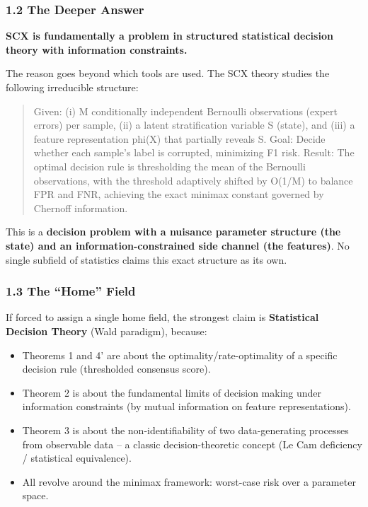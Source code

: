 \documentclass[
  12pt,
]{ctexart}
\providecommand{\tightlist}{%
  \setlength{\itemsep}{0pt}\setlength{\parskip}{0pt}}
\begin{document}
\subsubsection{1.2 The Deeper Answer}\label{the-deeper-answer}

\textbf{SCX is fundamentally a problem in structured statistical
decision theory with information constraints.}

The reason goes beyond which tools are used. The SCX theory studies the
following irreducible structure:

\begin{quote}
Given: (i) M conditionally independent Bernoulli observations (expert
errors) per sample, (ii) a latent stratification variable S (state), and
(iii) a feature representation phi(X) that partially reveals S. Goal:
Decide whether each sample's label is corrupted, minimizing F1 risk.
Result: The optimal decision rule is thresholding the mean of the
Bernoulli observations, with the threshold adaptively shifted by O(1/M)
to balance FPR and FNR, achieving the exact minimax constant governed by
Chernoff information.
\end{quote}

This is a \textbf{decision problem with a nuisance parameter structure
(the state) and an information-constrained side channel (the features)}.
No single subfield of statistics claims this exact structure as its own.

\subsubsection{1.3 The ``Home'' Field}\label{the-home-field}

If forced to assign a single home field, the strongest claim is
\textbf{Statistical Decision Theory} (Wald paradigm), because:

\begin{itemize}
\tightlist
\item
  Theorems 1 and 4' are about the optimality/rate-optimality of a
  specific decision rule (thresholded consensus score).
\item
  Theorem 2 is about the fundamental limits of decision making under
  information constraints (by mutual information on feature
  representations).
\item
  Theorem 3 is about the non-identifiability of two data-generating
  processes from observable data -- a classic decision-theoretic concept
  (Le Cam deficiency / statistical equivalence).
\item
  All revolve around the minimax framework: worst-case risk over a
  parameter space.
\end{itemize}
\end{document}
